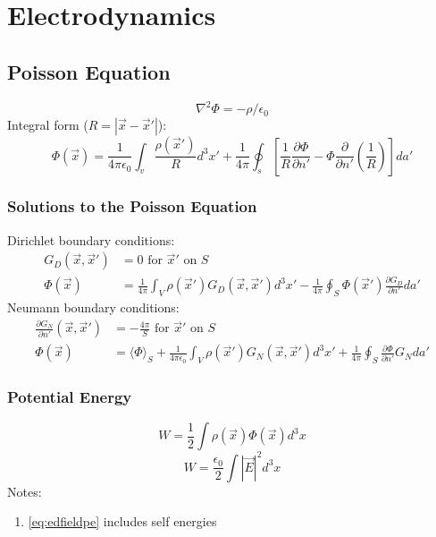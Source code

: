 \chapter{Electrodynamics}

\section{Poisson Equation}

\begin{equation}
	\nabla^2 \Phi = -\rho/\epsilon_0
\end{equation}
Integral form ($R=|\vec x - \vec x'|$):
\begin{equation}
	\Phi(\vec x) = \frac{1}{4 \pi \epsilon_0} \int_v \frac{\rho(\vec{x}') }{R} d^3x' + 
	\frac{1}{4\pi}\oint_s \left[ \frac{1}{R} \frac{\partial \Phi}{\partial n'} - \Phi \frac{\partial}{\partial n'}\left( \frac{1}{R} \right) \right] da'
\end{equation}

\subsection{Solutions to the Poisson Equation}
Dirichlet boundary conditions:
\begin{equation}
	\begin{split}
		G_D(\vec x, \vec{x}') &= 0  \text{  for $\vec{x}'$ on $S$} \\
		\Phi(\vec{x}) &= \frac{1}{4 \pi} \int_V \rho(\vec{x}')G_D(\vec{x}, \vec{x}')d^3x' - \frac{1}{4 \pi} \oint_S \Phi(\vec{x}')\frac{\partial G_D}{\partial n'}da' 	
	\end{split}
\end{equation}
Neumann boundary conditions:
\begin{equation}
	\begin{split}
		\frac{\partial G_N}{\partial n'}(\vec x, \vec{x}')  &= -\frac{4 \pi}{S}  \text{  for $\vec{x}'$ on $S$} \\
		\Phi(\vec{x}) &= \langle \Phi \rangle_S 
		+ \frac{1}{4 \pi \epsilon_0} \int_V \rho(\vec{x}')G_N(\vec{x}, \vec{x}')d^3x' 
		+ \frac{1}{4 \pi} \oint_S \frac{\partial \Phi}{\partial n'} G_N da' 	
	\end{split}
\end{equation}

\subsection{Potential Energy}
\begin{equation}
	W = \frac{1}{2} \int \rho(\vec{x}) \Phi(\vec{x}) d^3x	
\end{equation}
\begin{equation} \label{eq:edfieldpe}
	W = \frac{\epsilon_0}{2} \int \left| \vec{E} \right|^2 d^3x
\end{equation}
Notes:
\begin{enumerate}
	\item \ref{eq:edfieldpe} includes self energies
\end{enumerate}


